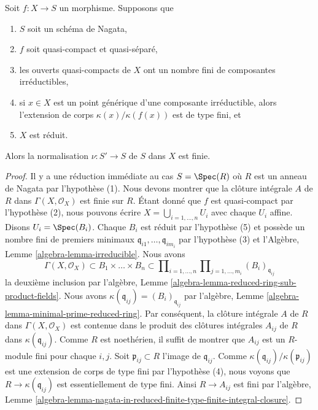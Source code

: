 \begin{lemma}
\label{lemma-nagata-normalization-finite-general}
Soit $f : X \to S$ un morphisme. Supposons que
\begin{enumerate}
\item $S$ soit un schéma de Nagata,
\item $f$ soit quasi-compact et quasi-séparé,
\item les ouverts quasi-compacts de $X$ ont un nombre fini de composantes irréductibles,
\item si $x \in X$ est un point générique d'une composante irréductible,
alors l'extension de corps $\kappa(x)/\kappa(f(x))$ est de type
fini, et
\item $X$ est réduit.
\end{enumerate}
Alors la normalisation $\nu : S' \to S$ de $S$ dans $X$ est finie.
\end{lemma}

\begin{proof}
Il y a une réduction immédiate au cas $S = \Spec(R)$ où $R$
est un anneau de Nagata par l'hypothèse (1). Nous devons montrer
que la clôture intégrale $A$ de $R$ dans $\Gamma(X, \mathcal{O}_X)$
est finie sur $R$. Étant donné que $f$ est quasi-compact
par l'hypothèse (2), nous pouvons écrire $X = \bigcup_{i = 1, \ldots, n} U_i$ avec
chaque $U_i$ affine. Disons $U_i = \Spec(B_i)$. Chaque $B_i$
est réduit par l'hypothèse (5) et
possède un nombre fini de premiers minimaux
$\mathfrak q_{i1}, \ldots, \mathfrak q_{im_i}$ par l'hypothèse
(3) et l'Algèbre, Lemme \ref{algebra-lemma-irreducible}. Nous
avons
$$
\Gamma(X, \mathcal{O}_X) \subset B_1 \times \ldots \times B_n
\subset
\prod\nolimits_{i = 1, \ldots, n}
\prod\nolimits_{j = 1, \ldots, m_i} (B_i)_{\mathfrak q_{ij}}
$$
la deuxième inclusion
par l'algèbre, Lemme \ref{algebra-lemma-reduced-ring-sub-product-fields}. Nous avons $\kappa(\mathfrak q_{ij}) = (B_i)_{\mathfrak q_{ij}}$
par l'algèbre, Lemme \ref{algebra-lemma-minimal-prime-reduced-ring}. Par conséquent,
la clôture intégrale $A$ de $R$ dans
$\Gamma(X, \mathcal{O}_X)$ est contenue dans le produit des clôtures
intégrales $A_{ij}$ de $R$ dans $\kappa(\mathfrak q_{ij})$.
Comme $R$ est noethérien, il suffit
de montrer que $A_{ij}$ est un $R$-module fini
pour chaque $i, j$. Soit $\mathfrak p_{ij} \subset R$ l'image de $\mathfrak q_{ij}$.
Comme $\kappa(\mathfrak q_{ij})/\kappa(\mathfrak p_{ij})$ est une extension
de corps de type fini par l'hypothèse (4), nous
voyons que $R \to \kappa(\mathfrak q_{ij})$ est essentiellement de type fini.
Ainsi $R \to A_{ij}$ est fini
par l'algèbre, Lemme \ref{algebra-lemma-nagata-in-reduced-finite-type-finite-integral-closure}.
\end{proof}

